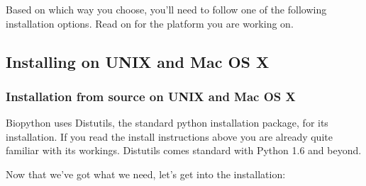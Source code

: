 \documentclass{article}
\begin{document}
Based on which way you choose, you'll need to follow one of the following installation options. Read on for the platform you are working on.

\subsection{Installing on UNIX and Mac OS X}
\label{sec:unix_install}

\subsubsection{Installation from source on UNIX and Mac OS X}

Biopython uses Distutils, the standard python installation package, for
its installation. If you read the install instructions above you are
already quite familiar with its workings. Distutils comes standard with 
Python 1.6 and beyond.

Now that we've got what we need, let's get into the installation:
\end{document}
